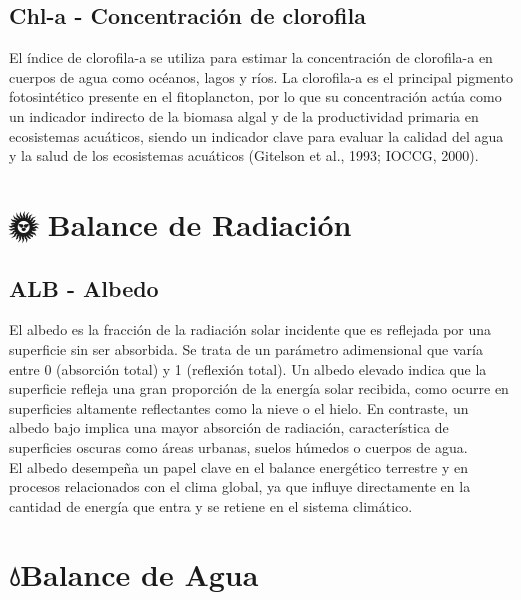 \documentclass[
]{book}
\begin{document}
\subsection{\texorpdfstring{\textbf{Chl-a} - Concentración de clorofila}{Chl-a - Concentración de clorofila}}\label{chl-a---concentraciuxf3n-de-clorofila}

El índice de clorofila-a se utiliza para estimar la concentración de clorofila-a en cuerpos de agua como océanos, lagos y ríos. La clorofila-a es el principal pigmento fotosintético presente en el fitoplancton, por lo que su concentración actúa como un indicador indirecto de la biomasa algal y de la productividad primaria en ecosistemas acuáticos, siendo un indicador clave para evaluar la calidad del agua y la salud de los ecosistemas acuáticos (Gitelson et al., 1993; IOCCG, 2000).

\section{\texorpdfstring{\textbf{🌞 Balance de Radiación}}{🌞 Balance de Radiación}}\label{balance-de-radiaciuxf3n}

\subsection{\texorpdfstring{\textbf{ALB} - Albedo}{ALB - Albedo}}\label{alb---albedo}

El albedo es la fracción de la radiación solar incidente que es reflejada por una superficie sin ser absorbida. Se trata de un parámetro adimensional que varía entre 0 (absorción total) y 1 (reflexión total). Un albedo elevado indica que la superficie refleja una gran proporción de la energía solar recibida, como ocurre en superficies altamente reflectantes como la nieve o el hielo. En contraste, un albedo bajo implica una mayor absorción de radiación, característica de superficies oscuras como áreas urbanas, suelos húmedos o cuerpos de agua.\\
El albedo desempeña un papel clave en el balance energético terrestre y en procesos relacionados con el clima global, ya que influye directamente en la cantidad de energía que entra y se retiene en el sistema climático.

\section{\texorpdfstring{\textbf{💧Balance de Agua}}{💧Balance de Agua}}\label{balance-de-agua}
\end{document}

